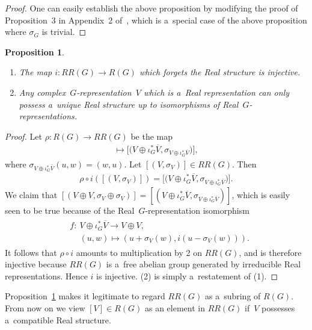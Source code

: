 \documentclass[pdftex]{sigma}
\numberwithin{equation}{section}
\newtheorem{Proposition}[Theorem]{Proposition}
{\theoremstyle{definition}
\newtheorem{Definition}[Theorem]{Definition}
\newtheorem{Example}[Theorem]{Example}
\newtheorem{Remark}[Theorem]{Remark}
}
\begin{document}
\begin{proof}
One can easily establish the above proposition
by modifying the proof of Proposition~3 in Appendix~2 of~\cite{B}, which
is a~special case of the above proposition
where $\sigma_G$ is trivial.
\end{proof}
\begin{Proposition}\label{realforgetfulinj}\quad
\begin{enumerate}\itemsep=0pt
\item[$1.$]
The map
$i: RR(G)\to R(G)$ which forgets the Real structure is injective.
\item[$2.$]
Any complex~$G$-representation~$V$ which is a~Real representation can only possess a~unique Real structure up to
isomorphisms of Real~$G$-representations.
\end{enumerate}
\end{Proposition}
\begin{proof}
Let $\rho: R(G)\to RR(G)$ be the map
\begin{gather*}
[V]\mapsto \big[\big(V\oplus\iota_G^*\overline{V},\sigma_{V\oplus\iota_G^*\overline{V}}\big)\big],
\end{gather*}
where $\sigma_{V\oplus\iota_G^*\overline{V}}(u, w)=(w, u)$.
Let $[(V,
\sigma_V)]\in RR(G)$.
Then
\begin{gather*}
\rho\circ i([(V,\sigma_V)])=\big[\big(V\oplus\iota_G^*\overline{V},\sigma_{V\oplus\iota_G^*\overline{V}}\big)\big].
\end{gather*}
We claim that $[(V\oplus V,\sigma_V\oplus\sigma_V)]=[(V\oplus\iota_G^*\overline{V},
\sigma_{V\oplus\iota_G^*\overline{V}})]$, which is easily seen to be true because of the Real~$G$-representation isomorphism
\begin{gather*}
\begin{split}
& f: \ V\oplus \iota_G^*\overline{V}  \to  V\oplus V,
\\
& \phantom{f:{}} \ (u, w)  \mapsto  (u+\sigma_V(w), i(u-\sigma_V(w))).
\end{split}
\end{gather*}
It follows that $\rho\circ i$ amounts to multiplication by 2 on $RR(G)$, and is therefore injective because $RR(G)$ is
a~free abelian group generated by irreducible Real representations.
Hence $i$ is injective.
(2) is simply a~restatement of (1).
\end{proof}
Proposition~\ref{realforgetfulinj} makes it legitimate to regard $RR(G)$ as a~subring of $R(G)$.
From now on we view $[V]\in R(G)$ as an element in $RR(G)$ if~$V$ possesses a~compatible Real structure.
\end{document}
